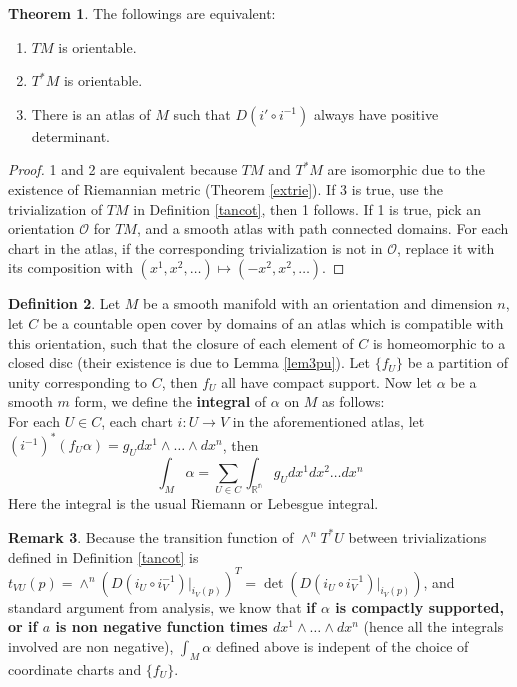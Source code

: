 \documentclass{article}
\theoremstyle{definition}
\newtheorem{thm}{Theorem}[section]
\newtheorem{dfn}[thm]{Definition}
\newtheorem{rmk}[thm]{Remark}
\begin{document}
\begin{thm}
    The followings are equivalent:
    \begin{enumerate}
        \item $TM$ is orientable.
        \item $T^*M$ is orientable.
        \item There is an atlas of $M$ such that $D(i'\circ i^{-1})$ always have positive determinant.
    \end{enumerate}
\end{thm}

\begin{proof}
    1 and 2 are equivalent because $TM$ and $T^*M$ are isomorphic due to the existence of Riemannian metric (Theorem \ref{extrie}). If 3 is true, use the trivialization of $TM$ in Definition \ref{tancot}, then 1 follows. If 1 is true, pick an orientation $\mathcal{O}$ for $TM$, and a smooth atlas with path connected domains. For each chart in the atlas, if the corresponding trivialization is not in $\mathcal{O}$, replace it with its composition with $(x^1, x^2,\dots)\mapsto (-x^2, x^2, \dots)$.
\end{proof}

\begin{dfn}
    Let $M$ be a smooth manifold with an orientation and dimension $n$, let $C$ be a countable open cover by domains of an atlas which is compatible with this orientation, such that the closure of each element of $C$ is homeomorphic to a closed disc (their existence is due to Lemma \ref{lem3pu}). Let $\{f_U\}$ be a partition of unity corresponding to $C$, then $f_U$ all have compact support. Now let $\alpha$ be a smooth $m$ form, we define the {\bf integral} of $\alpha$ on $M$ as follows: \\

    For each $U\in C$, each chart $i: U\rightarrow V$ in the aforementioned atlas, let $(i^{-1})^*(f_U\alpha)=g_U dx^1\wedge \dots \wedge dx^n$, then
    \[\int_M \alpha=\sum_{U\in C}\int_{\mathbb{R^n}}g_Udx^1dx^2\dots dx^n\]
    Here the integral is the usual Riemann or Lebesgue integral.
\end{dfn}

\begin{rmk}\label{intinv}
    Because the transition function of $\wedge^n T^*U$ between trivializations defined in Definition \ref{tancot} is $t_{VU}(p)=\wedge^n(D(i_U\circ i_V^{-1})|_{i_V(p)})^T=\det(D(i_U\circ i_V^{-1})|_{i_V(p)})$, and standard argument from analysis, we know that {\bf if $\alpha$ is compactly supported, or if $a$ is non negative function times $dx^1\wedge\dots\wedge dx^n$} (hence all the integrals involved are non negative), $\int_M \alpha$ defined above is indepent of the choice of coordinate charts and $\{f_U\}$. 
\end{rmk}
\end{document}
